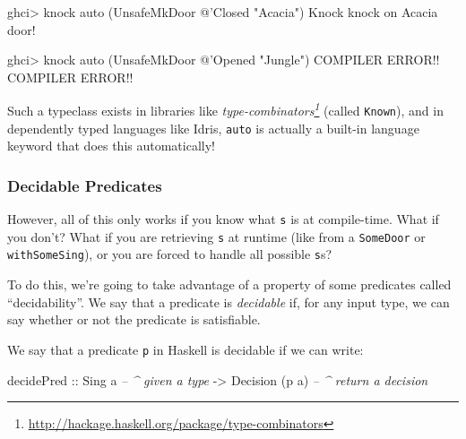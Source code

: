 \documentclass[]{article}
\newenvironment{Shaded}{}{}
\newcommand{\CommentTok}[1]{\textcolor[rgb]{0.38,0.63,0.69}{\textit{#1}}}
\newcommand{\DataTypeTok}[1]{\textcolor[rgb]{0.56,0.13,0.00}{#1}}
\newcommand{\FunctionTok}[1]{\textcolor[rgb]{0.02,0.16,0.49}{#1}}
\newcommand{\NormalTok}[1]{#1}
\newcommand{\OtherTok}[1]{\textcolor[rgb]{0.00,0.44,0.13}{#1}}
\newcommand{\StringTok}[1]{\textcolor[rgb]{0.25,0.44,0.63}{#1}}
\renewcommand{\href}[2]{#2\footnote{\url{#1}}}
\begin{document}
\begin{Shaded}
\begin{Highlighting}[]
\NormalTok{ghci}\FunctionTok{>}\NormalTok{ knock auto (}\DataTypeTok{UnsafeMkDoor} \FunctionTok{@}\NormalTok{'}\DataTypeTok{Closed} \StringTok{"Acacia"}\NormalTok{)}
\DataTypeTok{Knock}\NormalTok{ knock on }\DataTypeTok{Acacia}\NormalTok{ door}\FunctionTok{!}

\NormalTok{ghci}\FunctionTok{>}\NormalTok{ knock auto (}\DataTypeTok{UnsafeMkDoor} \FunctionTok{@}\NormalTok{'}\DataTypeTok{Opened} \StringTok{"Jungle"}\NormalTok{)}
\DataTypeTok{COMPILER} \DataTypeTok{ERROR}\FunctionTok{!!} \DataTypeTok{COMPILER} \DataTypeTok{ERROR}\FunctionTok{!!}
\end{Highlighting}
\end{Shaded}

Such a typeclass exists in libraries like
\emph{\href{http://hackage.haskell.org/package/type-combinators}{type-combinators}}
(called \texttt{Known}), and in dependently typed languages like Idris,
\texttt{auto} is actually a built-in language keyword that does this
automatically!

\hypertarget{decidable-predicates}{%
\subsubsection{Decidable Predicates}\label{decidable-predicates}}

However, all of this only works if you know what \texttt{s} is at compile-time.
What if you don't? What if you are retrieving \texttt{s} at runtime (like from a
\texttt{SomeDoor} or \texttt{withSomeSing}), or you are forced to handle all
possible \texttt{s}s?

To do this, we're going to take advantage of a property of some predicates
called ``decidability''. We say that a predicate is \emph{decidable} if, for any
input type, we can say whether or not the predicate is satisfiable.

We say that a predicate \texttt{p} in Haskell is decidable if we can write:

\begin{Shaded}
\begin{Highlighting}[]
\NormalTok{decidePred}
\OtherTok{    ::} \DataTypeTok{Sing}\NormalTok{ a               }\CommentTok{-- ^ given a type}
    \OtherTok{->} \DataTypeTok{Decision}\NormalTok{ (p a)       }\CommentTok{-- ^ return a decision}
\end{Highlighting}
\end{Shaded}
\end{document}
